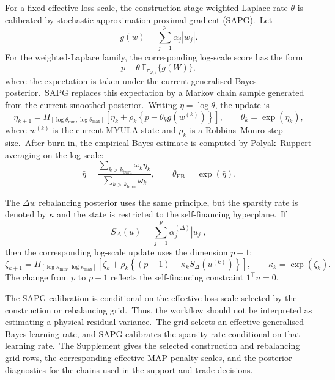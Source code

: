 \documentclass[11pt]{article}
\begin{document}
For a fixed effective loss scale, the construction-stage weighted-Laplace rate \(\theta\) is calibrated by stochastic approximation proximal gradient (SAPG).\ Let
\[
g(w)=\sum_{j=1}^p \alpha_j |w_j|.
\]
For the weighted-Laplace family, the corresponding log-scale score has the form
\[
p-\theta\,\mathbb{E}_{\pi_{\omega,\theta}}\{g(W)\},
\]
where the expectation is taken under the current generalised-Bayes posterior.\ SAPG replaces this expectation by a Markov chain sample generated from the current smoothed posterior.\ Writing \(\eta=\log\theta\), the update is
\[
\eta_{k+1}
=
\Pi_{[\log\theta_{\min},\log\theta_{\max}]}
\left[
\eta_k
+
\rho_k
\left\{
p-\theta_k g(w^{(k)})
\right\}
\right],
\qquad
\theta_k=\exp(\eta_k),
\]
where \(w^{(k)}\) is the current MYULA state and \(\rho_k\) is a Robbins--Monro step size.\ After burn-in, the empirical-Bayes estimate is computed by Polyak--Ruppert averaging on the log scale:
\[
\bar\eta
=
\frac{\sum_{k>k_{\mathrm{burn}}}\omega_k\eta_k}
{\sum_{k>k_{\mathrm{burn}}}\omega_k},
\qquad
\theta_{\mathrm{EB}}=\exp(\bar\eta).
\]

The \(\Delta w\) rebalancing posterior uses the same principle, but the sparsity rate is denoted by \(\kappa\) and the state is restricted to the self-financing hyperplane.\ If
\[
S_\Delta(u)
=
\sum_{j=1}^p \alpha_j^{(\Delta)} |u_j|,
\]
then the corresponding log-scale update uses the dimension \(p-1\):
\[
\zeta_{k+1}
=
\Pi_{[\log\kappa_{\min},\log\kappa_{\max}]}
\left[
\zeta_k
+
\rho_k
\left\{
(p-1)-\kappa_k S_\Delta(u^{(k)})
\right\}
\right],
\qquad
\kappa_k=\exp(\zeta_k).
\]
The change from \(p\) to \(p-1\) reflects the self-financing constraint \(1^\top u=0\).

The SAPG calibration is conditional on the effective loss scale selected by the construction or rebalancing grid.\ Thus, the workflow should not be interpreted as estimating a physical residual variance.\ The grid selects an effective generalised-Bayes learning rate, and SAPG calibrates the sparsity rate conditional on that learning rate.\ The Supplement gives the selected construction and rebalancing grid rows, the corresponding effective MAP penalty scales, and the posterior diagnostics for the chains used in the support and trade decisions.
\end{document}
